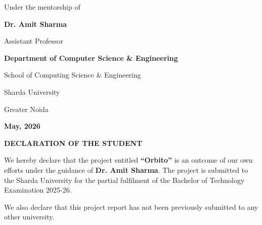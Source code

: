 \documentclass[12pt,a4paper]{article}
\begin{document}
\begin{titlepage}
    {\normalsize Under the mentorship of\par}
    \vspace{0.25cm}
    {\large\bfseries Dr. Amit Sharma\par}
    {\normalsize Assistant Professor\par}
    
    \vfill
    
    {\normalsize\bfseries\color{coverblue} Department of Computer Science \& Engineering\par}
    \vspace{0.1cm}
    {\normalsize School of Computing Science \& Engineering\par}
    \vspace{0.1cm}
    {\normalsize Sharda University\par}
    \vspace{0.1cm}
    {\normalsize Greater Noida\par}
    \vspace{0.15cm}
    {\normalsize\bfseries\color{coverblue} May, 2026\par}
    \vspace*{0.2cm}
\end{titlepage}

\setcounter{page}{2}

\newpage
{}
\vspace*{0pt}
\begin{center}
    {\Large\bfseries DECLARATION OF THE STUDENT\par}
\end{center}
\vspace{0.8cm}

\noindent
We hereby declare that the project entitled \textbf{``Orbito''} is an outcome of our own efforts under the guidance of \textbf{Dr. Amit Sharma}. The project is submitted to the Sharda University for the partial fulfilment of the Bachelor of Technology Examination 2025-26.

\vspace{0.8cm}
\noindent
We also declare that this project report has not been previously submitted to any other university.

\vspace{3.0cm}
\end{document}
